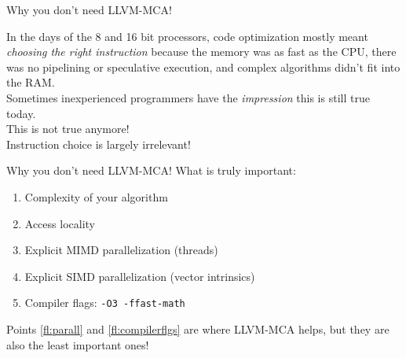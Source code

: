 \begin{frame}{Why you don't need LLVM-MCA!}
\begin{center}
In the days of the 8 and 16 bit processors, \alert{code optimization} mostly meant \emph{choosing the right instruction} because the memory was as fast as the CPU, there was no pipelining or speculative execution, and complex algorithms didn't fit into the RAM.\\
\medskip
Sometimes inexperienced programmers have the \emph{impression} this is still true today.\\
\bigskip
{\Large This is not true anymore!}\\
\bigskip
Instruction choice is \alert{largely irrelevant}!\\
\end{center}
\end{frame}


\begin{frame}{Why you don't need LLVM-MCA!}
What is \alert{truly} important:
\begin{enumerate}
\item Complexity of your algorithm
\item Access locality
\item Explicit MIMD parallelization (threads)
\item Explicit SIMD parallelization (vector intrinsics)\label{fl:parall}
\item Compiler flags: \texttt{-O3 -ffast-math}\label{fl:compilerflgs}
\end{enumerate}
\bigskip
Points \ref{fl:parall} and \ref{fl:compilerflgs} are where LLVM-MCA helps, but they are also the least important ones!
\end{frame}

